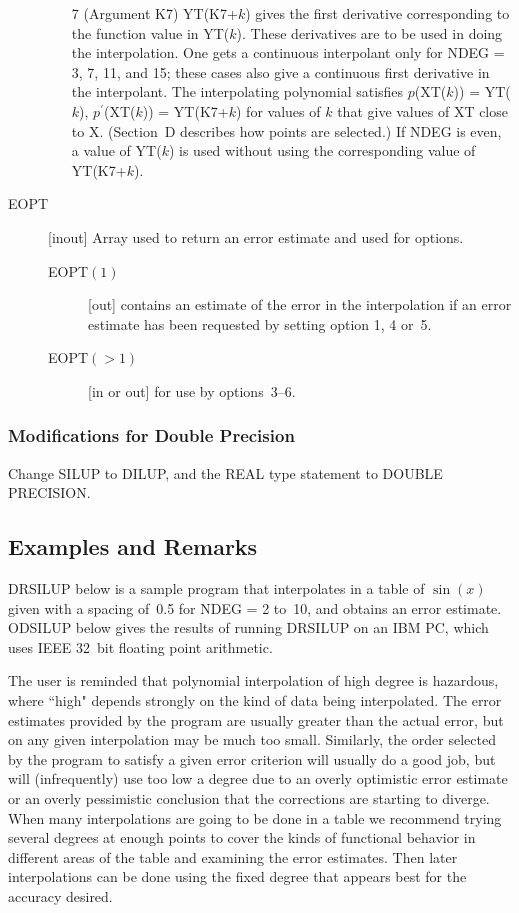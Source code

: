 \documentclass[twoside]{MATH77}
\begin{document}
\begin{description}
\begin{itemize}
\item[7] (Argument K7) YT(K7+$k$) gives the first derivative
corresponding to the function value in YT($k$).  These derivatives
are to be used in doing the interpolation.  One gets a continuous
interpolant only for NDEG = 3, 7, 11, and 15; these cases also give a
continuous first derivative in the interpolant.  The interpolating
polynomial satisfies $p$(XT($k$)) = YT($k$), $p^\prime $(XT($k$)) =
YT(K7+$k$) for values of $k$ that give values of XT close to X.
(Section~D describes how points are selected.) If NDEG is even, a
value of YT($k$) is used without using the corresponding value of
YT(K7+$k$).


\end{itemize}

\item[EOPT]  [inout] Array used to return an error estimate and used for
options.

\begin{description}
\item[EOPT$(1)$]  [out] contains an estimate of the error in the
interpolation if an error estimate has been requested by setting
option 1, 4 or~5.

\item[EOPT$(>1)$]  [in or out] for use by options~3--6.
\end{description}
\end{description}

\subsubsection{Modifications for Double Precision}

Change SILUP to DILUP, and the REAL type statement to DOUBLE PRECISION.

\subsection{Examples and Remarks}

DRSILUP below is a sample program that interpolates in a table of $\sin
(x)$ given with a spacing of~0.5 for NDEG = 2 to~10, and obtains an error
estimate. ODSILUP below gives the results of running DRSILUP on an IBM PC,
which uses IEEE 32~bit floating point arithmetic.

The user is reminded that polynomial interpolation of high degree is
hazardous, where ``high" depends strongly on the kind of data being
interpolated. The error estimates provided by the program are usually
greater than the actual error, but on any given interpolation may be much
too small. Similarly, the order selected by the program to satisfy a given
error criterion will usually do a good job, but will (infrequently) use too
low a degree due to an overly optimistic error estimate or an overly
pessimistic conclusion that the corrections are starting to diverge. When
many interpolations are going to be done in a table we recommend trying
several degrees at enough points to cover the kinds of functional behavior
in different areas of the table and examining the error estimates. Then
later interpolations can be done using the fixed degree that appears best
for the accuracy desired.
\end{document}
